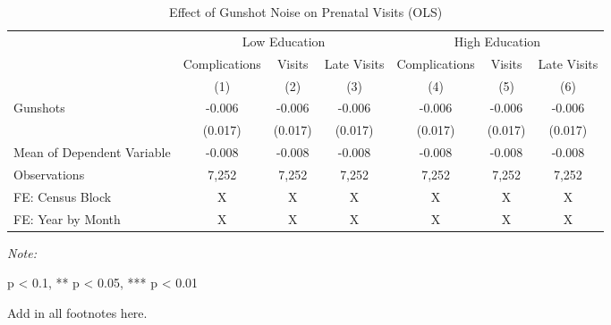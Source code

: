 \begin{table}[H]
\centering
\caption{\label{mechanism_table}Effect of Gunshot Noise on Prenatal Visits (OLS)}
\centering
\begin{threeparttable}
\fontsize{11}{13}\selectfont
\begin{tabular}[t]{lcccccc}
\toprule
\multicolumn{1}{c}{ } & \multicolumn{3}{c}{Low Education} & \multicolumn{3}{c}{High Education} \\
\cmidrule(l{3pt}r{3pt}){2-4} \cmidrule(l{3pt}r{3pt}){5-7}
\multicolumn{1}{c}{ } & \multicolumn{1}{c}{Complications} & \multicolumn{1}{c}{Visits} & \multicolumn{1}{c}{Late Visits} & \multicolumn{1}{c}{Complications} & \multicolumn{1}{c}{Visits} & \multicolumn{1}{c}{Late Visits} \\
\cmidrule(l{3pt}r{3pt}){2-2} \cmidrule(l{3pt}r{3pt}){3-3} \cmidrule(l{3pt}r{3pt}){4-4} \cmidrule(l{3pt}r{3pt}){5-5} \cmidrule(l{3pt}r{3pt}){6-6} \cmidrule(l{3pt}r{3pt}){7-7}
  & (1) & (2) & (3) & (4) & (5) & (6)\\
\midrule
Gunshots & -0.006 & -0.006 & -0.006 & -0.006 & -0.006 & -0.006\\
 & (0.017) & (0.017) & (0.017) & (0.017) & (0.017) & (0.017)\\
Mean of Dependent Variable & -0.008 & -0.008 & -0.008 & -0.008 & -0.008 & -0.008\\
Observations & 7,252 & 7,252 & 7,252 & 7,252 & 7,252 & 7,252\\
FE: Census Block & X & X & X & X & X & X\\
\addlinespace
FE: Year by Month & X & X & X & X & X & X\\
\bottomrule
\end{tabular}
\begin{tablenotes}
\item \textit{Note: } 
\item * p < 0.1, ** p < 0.05, *** p < 0.01
\item Add in all footnotes here.
\end{tablenotes}
\end{threeparttable}
\end{table}
